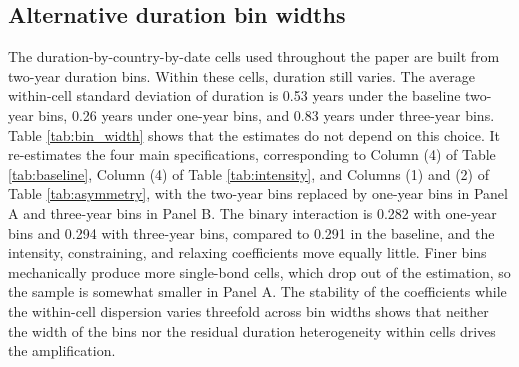 \documentclass[english, 11pt, oneside]{article}
\begin{document}
\begin{table}[h!]
\label{tab:placebo}
\caption*{\textit{Notes:} This table reports placebo tests where monetary policy shocks are shifted to break the causal timing. The dependent variable is the daily change in bond yield (bps). \textit{HF Involved} indicates the presence of offshore hedge fund repo activity. \textit{Log HF Intensity} is the natural log of one plus pre-period hedge fund intensity. Column (1) corresponds to Column (4) in Table \ref{tab:baseline}, Column (2) to Column (4) in Table \ref{tab:intensity}, and Columns (3) and (4) to Columns (1) and (2) in Table \ref{tab:asymmetry}. The Shock main effect is not absorbed by fixed effects in this specification as the placebo shock does not coincide with the benchmark date cells. Standard errors are clustered by date and bond and reported in parentheses. *** p$<$0.01, ** p$<$0.05, * p$<$0.10. \\ Sample period: 2021-01-01 -- 2025-11-01}
\end{table}

\clearpage
\subsection{Alternative duration bin widths}
\label{subsec:bin_width}

The duration-by-country-by-date cells used throughout the paper are built from two-year duration bins. Within these cells, duration still varies. The average within-cell standard deviation of duration is 0.53 years under the baseline two-year bins, 0.26 years under one-year bins, and 0.83 years under three-year bins. Table \ref{tab:bin_width} shows that the estimates do not depend on this choice. It re-estimates the four main specifications, corresponding to Column (4) of Table \ref{tab:baseline}, Column (4) of Table \ref{tab:intensity}, and Columns (1) and (2) of Table \ref{tab:asymmetry}, with the two-year bins replaced by one-year bins in Panel A and three-year bins in Panel B. The binary interaction is 0.282 with one-year bins and 0.294 with three-year bins, compared to 0.291 in the baseline, and the intensity, constraining, and relaxing coefficients move equally little. Finer bins mechanically produce more single-bond cells, which drop out of the estimation, so the sample is somewhat smaller in Panel A. The stability of the coefficients while the within-cell dispersion varies threefold across bin widths shows that neither the width of the bins nor the residual duration heterogeneity within cells drives the amplification. \\
\end{document}
